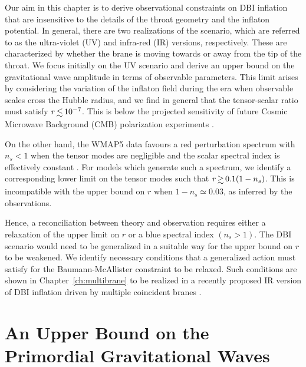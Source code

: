 Our aim in this chapter is to derive observational constraints on DBI inflation
that are 
insensitive to the details of the throat geometry and the inflaton potential. 
In general, there are two realizations of the scenario, 
which are referred to as the ultra-violet (UV) and infra-red (IR) 
versions, respectively. These are characterized by whether the brane is 
moving towards or away from the tip of the throat. 
We focus initially on the UV scenario 
and derive an upper bound on 
the gravitational wave amplitude in terms of observable 
parameters. This limit arises by considering 
the variation of the inflaton field during the era when 
observable scales cross the Hubble radius, and 
we find in general that the tensor-scalar ratio must satisfy 
$r \, \lsim \, 10^{-7}$. This 
is below the projected sensitivity of future Cosmic Microwave Background (CMB) polarization 
experiments \cite{Baumann:2008aq,vpj}. 

On the other hand, the WMAP5 data 
favours a red perturbation spectrum with 
$n_s<1$ when the tensor modes are negligible and 
the scalar spectral index is effectively constant \cite{Komatsu:2008hk}. 
For models which generate such a spectrum, 
we identify a corresponding lower limit on the 
tensor modes such that $r \, \gsim \, 0.1 (1-n_s)$. 
This is incompatible with the upper bound 
on $r$ when $1-n_s \simeq 0.03$, as inferred
by the observations. 

Hence, a reconciliation between theory and observation 
requires either a relaxation of the upper limit on $r$ or a blue 
spectral index $(n_s >1)$. The DBI scenario would need 
to be generalized in a suitable way for the upper bound on $r$
to be weakened. We identify necessary conditions that a 
generalized action must satisfy for the Baumann-McAllister
 constraint to be relaxed. 
Such conditions are shown in Chapter~\ref{ch:multibrane} to be
realized in a recently proposed IR version of DBI inflation driven
by multiple coincident branes \cite{thomasward}. 

% 
% 
\section{An Upper Bound on the Primordial Gravitational Waves}
% 
\label{sec:upper-dbi}
%

